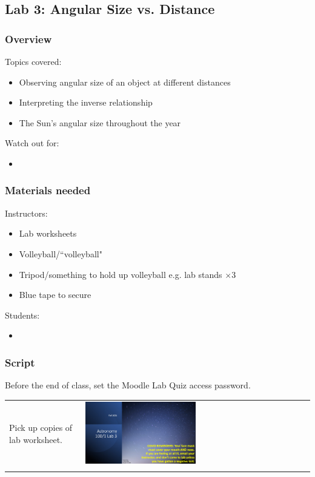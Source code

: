 \documentclass[12pt]{article}
\begin{document}
\newpage
\subsection{Lab 3: Angular Size vs. Distance}

\subsubsection{Overview}

Topics covered:
\begin{itemize}
\item Observing angular size of an object at different distances
\item Interpreting the inverse relationship
\item The Sun’s angular size throughout the year
\end{itemize}

\noindent
Watch out for:
\begin{itemize}
\item 
\end{itemize}


\subsubsection{Materials needed}

Instructors:
\begin{itemize}
\item Lab worksheets
\item Volleyball/``volleyball"
\item Tripod/something to hold up volleyball e.g. lab stands $\times 3$
\item Blue tape to secure
\end{itemize}

\noindent
Students:
\begin{itemize}
\item 
\end{itemize}


\subsubsection{Script}

Before the end of class, set the Moodle Lab Quiz access password.

\begin{longtable}{m{}m{}}
Pick up copies of lab worksheet. & \includegraphics[width=0.5\textwidth]{ppt/lab03/Slide1.jpeg}\\

\label{default}
\end{longtable}
\end{document}
